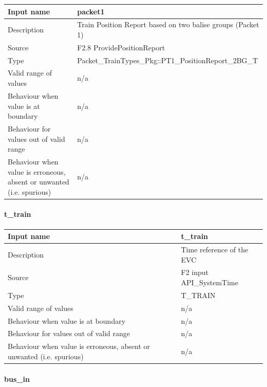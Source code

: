 \begin{longtable}{p{}p{}}
\toprule
Input name				& packet1\\
\midrule
Description				& Train Position Report based on two balise groups (Packet 1)  \\
\midrule
Source					& F2.8 ProvidePositionReport \\ 
\midrule
Type					& Packet\_TrainTypes\_Pkg::PT1\_PositionReport\_2BG\_T\\
\midrule
Valid range of values	& n/a \\
\midrule
Behaviour when value is at boundary	& n/a\\
\midrule
Behaviour for values out of valid range	& n/a\\
\midrule
Behaviour when value is erroneous, absent or unwanted (i.e. spurious) & n/a\\

\bottomrule


\end{longtable}


\paragraph{t\_train}

\begin{longtable}{p{}p{}}
\toprule
Input name				& t\_train\\
\midrule
Description				& Time reference of the EVC  \\
\midrule
Source					& F2 input API\_SystemTime\\ 
\midrule
Type					& T\_TRAIN\\
\midrule
Valid range of values	& n/a \\
\midrule
Behaviour when value is at boundary	& n/a\\
\midrule
Behaviour for values out of valid range	& n/a\\
\midrule
Behaviour when value is erroneous, absent or unwanted (i.e. spurious) & n/a\\

\bottomrule


\end{longtable}


\paragraph{bus\_in}

